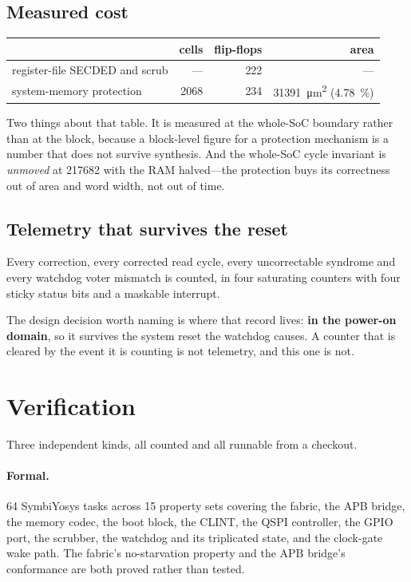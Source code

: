 \documentclass[11pt,a4paper]{article}
\begin{document}
\subsection{Measured cost}

\begin{center}
\begin{tabular}{lrrr}
\toprule
& cells & flip-flops & area \\
\midrule
register-file SECDED and scrub & --- & \num{222} & --- \\
system-memory protection & \num{2068} & \num{234} &
  \SI{31391}{\um\squared} (\SI{4.78}{\percent}) \\
\bottomrule
\end{tabular}
\end{center}

Two things about that table. It is measured at the whole-SoC boundary
rather than at the block, because a block-level figure for a protection
mechanism is a number that does not survive synthesis. And the
whole-SoC cycle invariant is \emph{unmoved} at \num{217682} with the RAM
halved---the protection buys its correctness out of area and word width,
not out of time.

\subsection{Telemetry that survives the reset}

Every correction, every corrected read cycle, every uncorrectable
syndrome and every watchdog voter mismatch is counted, in four
saturating counters with four sticky status bits and a maskable
interrupt.

The design decision worth naming is where that record lives: \textbf{in
the power-on domain}, so it survives the system reset the watchdog
causes. A counter that is cleared by the event it is counting is not
telemetry, and this one is not.

\section{Verification}
\label{sec:verify}

Three independent kinds, all counted and all runnable from a checkout.

\paragraph{Formal.} \num{64} SymbiYosys tasks across \num{15} property
sets covering the fabric, the APB bridge, the memory codec, the boot
block, the CLINT, the QSPI controller, the GPIO port, the scrubber, the
watchdog and its triplicated state, and the clock-gate wake path. The
fabric's no-starvation property and the APB bridge's conformance are
both proved rather than tested.
\end{document}
